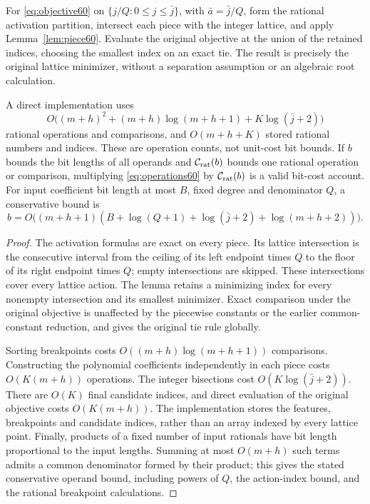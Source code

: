 \begin{theorem}\label{thm:rootfree60}
For \eqref{eq:objective60} on $\{j/Q:0\le j\le\bar j\}$, with $\bar a=\bar j/Q$, form the rational activation partition, intersect each piece with the integer lattice, and apply Lemma~\ref{lem:piece60}. Evaluate the original objective at the union of the retained indices, choosing the smallest index on an exact tie. The result is precisely the original lattice minimizer, without a separation assumption or an algebraic root calculation.

A direct implementation uses
\begin{equation}\label{eq:operations60}
 O\bigl((m+h)^2+(m+h)\log(m+h+1)+K\log(\bar j+2)\bigr)
\end{equation}
rational operations and comparisons, and $O(m+h+K)$ stored rational numbers and indices. These are operation counts, not unit-cost bit bounds. If $b$ bounds the bit lengths of all operands and $\mathcal C_{\rm rat}(b)$ bounds one rational operation or comparison, multiplying \eqref{eq:operations60} by $\mathcal C_{\rm rat}(b)$ is a valid bit-cost account. For input coefficient bit length at most $B$, fixed degree and denominator $Q$, a conservative bound is
\[
 b=O\bigl((m+h+1)(B+\log(Q+1)+\log(\bar j+2)+\log(m+h+2))\bigr).
\]
\end{theorem}
\begin{proof}
The activation formulas are exact on every piece. Its lattice intersection is the consecutive interval from the ceiling of its left endpoint times $Q$ to the floor of its right endpoint times $Q$; empty intersections are skipped. These intersections cover every lattice action. The lemma retains a minimizing index for every nonempty intersection and its smallest minimizer. Exact comparison under the original objective is unaffected by the piecewise constants or the earlier common-constant reduction, and gives the original tie rule globally.

Sorting breakpoints costs $O((m+h)\log(m+h+1))$ comparisons. Constructing the polynomial coefficients independently in each piece costs $O(K(m+h))$ operations. The integer bisections cost $O(K\log(\bar j+2))$. There are $O(K)$ final candidate indices, and direct evaluation of the original objective costs $O(K(m+h))$. The implementation stores the features, breakpoints and candidate indices, rather than an array indexed by every lattice point. Finally, products of a fixed number of input rationals have bit length proportional to the input lengths. Summing at most $O(m+h)$ such terms admits a common denominator formed by their product; this gives the stated conservative operand bound, including powers of $Q$, the action-index bound, and the rational breakpoint calculations.
\end{proof}

